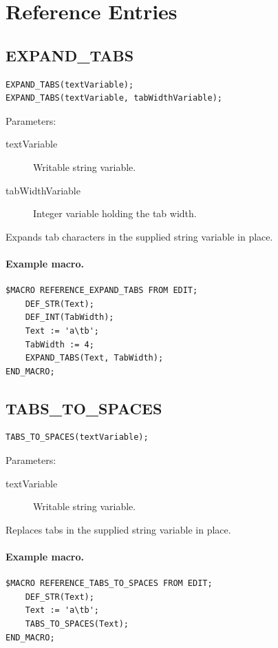\documentclass[a4paper,10pt,twoside,openany]{book}
\begin{document}
\section{Reference Entries}

\label{prim:procedure-expand-tabs}
\subsection*{EXPAND\_TABS}
\begin{verbatim}
EXPAND_TABS(textVariable);
EXPAND_TABS(textVariable, tabWidthVariable);
\end{verbatim}
Parameters:
\begin{description}
\item[textVariable] Writable string variable.
\item[tabWidthVariable] Integer variable holding the tab width.
\end{description}

Expands tab characters in the supplied string variable in place.

\paragraph{Example macro.}
\begin{verbatim}
$MACRO REFERENCE_EXPAND_TABS FROM EDIT;
    DEF_STR(Text);
    DEF_INT(TabWidth);
    Text := 'a\tb';
    TabWidth := 4;
    EXPAND_TABS(Text, TabWidth);
END_MACRO;
\end{verbatim}

\label{prim:procedure-tabs-to-spaces}
\subsection*{TABS\_TO\_SPACES}
\begin{verbatim}
TABS_TO_SPACES(textVariable);
\end{verbatim}
Parameters:
\begin{description}
\item[textVariable] Writable string variable.
\end{description}

Replaces tabs in the supplied string variable in place.

\paragraph{Example macro.}
\begin{verbatim}
$MACRO REFERENCE_TABS_TO_SPACES FROM EDIT;
    DEF_STR(Text);
    Text := 'a\tb';
    TABS_TO_SPACES(Text);
END_MACRO;
\end{verbatim}
\end{document}
